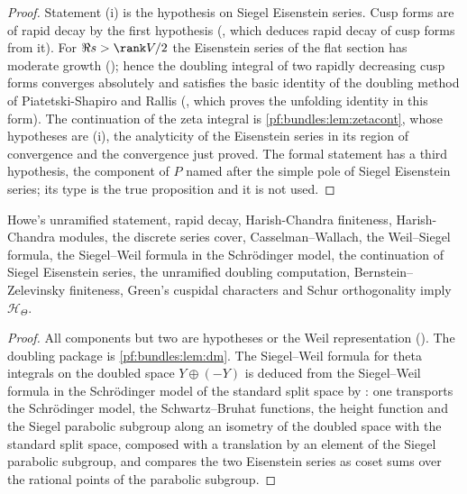 \begin{proof}
Statement (i) is the hypothesis on Siegel Eisenstein series. Cusp forms are of rapid decay by the first hypothesis
(, which deduces rapid decay of cusp forms from it). For $\Re s>\rank V/2$ the
Eisenstein series of the flat section has moderate growth
(); hence the doubling integral of two rapidly
decreasing cusp forms converges absolutely and satisfies the basic identity of the doubling method of Piatetski-Shapiro and Rallis
\cite{PiatetskiShapiroRallis1987} (, which proves the unfolding
identity in this form). The continuation of the zeta integral is \cref{pf:bundles:lem:zetacont}, whose hypotheses are (i), the
analyticity of the Eisenstein series in its region of convergence and the convergence just proved. The formal statement has a third
hypothesis, the component of $P$ named after the simple pole of Siegel Eisenstein series; its type is the true proposition and it is
not used.
\end{proof}

\begin{lemma}\label{pf:bundles:lem:thetacond}
Howe's unramified statement, rapid decay, Harish-Chandra finiteness, Harish-Chandra modules, the discrete series cover,
Casselman--Wallach, the Weil--Siegel formula, the Siegel--Weil formula in the Schr\"odinger model, the continuation of Siegel
Eisenstein series, the unramified doubling computation, Bernstein--Zelevinsky finiteness, Green's cuspidal characters and Schur
orthogonality imply $\mathcal H_\Theta$.
\end{lemma}

\begin{proof}
All components but two are hypotheses or the Weil representation (). The
doubling package is \cref{pf:bundles:lem:dm}. The Siegel--Weil formula for theta integrals on the doubled space $Y\oplus(-Y)$ is
deduced from the Siegel--Weil formula in the Schr\"odinger model of the standard split space by
: one transports the Schr\"odinger model, the Schwartz--Bruhat
functions, the height function and the Siegel parabolic subgroup along an isometry of the doubled space with the standard split
space, composed with a translation by an element of the Siegel parabolic subgroup, and compares the two Eisenstein series as coset
sums over the rational points of the parabolic subgroup.
\end{proof}


